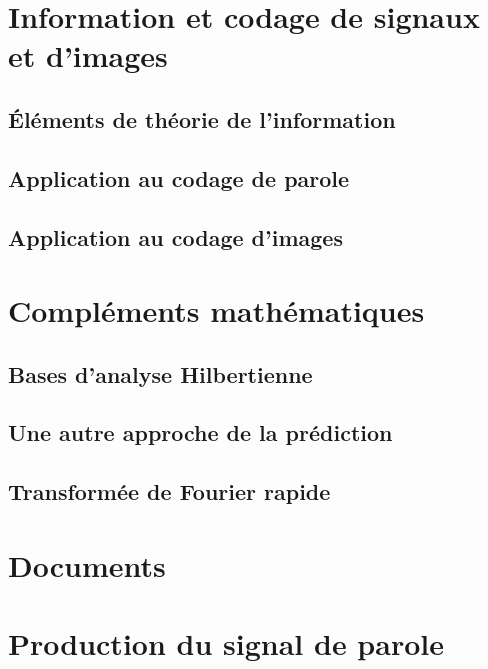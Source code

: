 \documentclass[graybox,envcountchap,envcountsame,sectrefs]{svmono}
\begin{document}
\part{Information et codage de signaux et d'images}
\chapter{\'El\'ements de th\'eorie de l'information}
\label{info-chap}

\chapter{Application au codage de parole}


\chapter{Application au codage d'images}


\appendix
\part{Compl\'ements math\'ematiques}
\chapter{Bases d'analyse Hilbertienne}

\chapter{Une autre approche de la prédiction}

\chapter{Transformée de Fourier rapide}

\part{Documents}
\part{Production du signal de parole}

\end{document}
